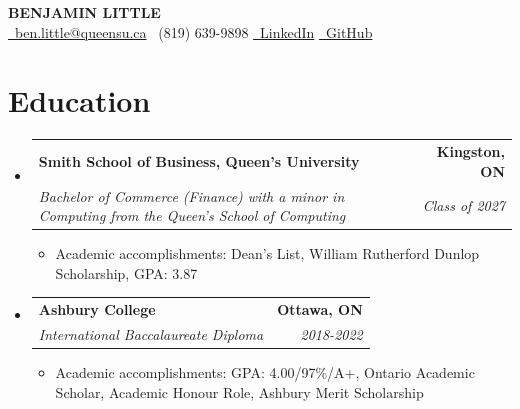 \documentclass[letterpaper,10pt]{article}
\makeatletter
\newcommand{\resumeItem}[1]{
  \item\small{
    {#1 \vspace{-2pt}}
  }
}
\newcommand{\resumeSubheading}[4]{
  \vspace{-2pt}\item
    \begin{tabular*}{1.0\textwidth}[t]{l@{\extracolsep{\fill}}r}
      \textbf{#1} & \textbf{\small #2} \\
      \textit{\small#3} & \textit{\small #4} \\
    \end{tabular*}\vspace{-7pt}
}
\newcommand{\resumeSubHeadingListStart}{\begin{itemize}[leftmargin=0.0in, label={}]}
\newcommand{\resumeSubHeadingListEnd}{\end{itemize}}
\newcommand{\resumeItemListStart}{\begin{itemize}[label=--]}
\newcommand{\resumeItemListEnd}{\end{itemize}\vspace{-5pt}}
\makeatother
\begin{document}
\begin{center}
    \textbf{\Huge \scshape BENJAMIN LITTLE} \\ \vspace{3pt}
    \scriptsize \href{mailto:ben.little@queensu.ca}{\faEnvelope \ ben.little@queensu.ca} \textbar{} \faPhone \ (819) 639-9898 \textbar{} \href{https://www.linkedin.com/in/benjamin-little1}{\faLinkedin \ LinkedIn} \textbar{} \href{https://github.com/BenLittle1}{\faGithub \ GitHub}
\end{center}
\vspace{-15pt}

\section{Education}
  \resumeSubHeadingListStart
    \resumeSubheading
      {Smith School of Business, Queen's University}{Kingston, ON}
      {Bachelor of Commerce (Finance) with a minor in Computing from the Queen's School of Computing}{Class of 2027}
      \resumeItemListStart
        \resumeItem{Academic accomplishments: Dean's List, William Rutherford Dunlop Scholarship, GPA: 3.87}
      \resumeItemListEnd
    \resumeSubheading
      {Ashbury College}{Ottawa, ON}
      {International Baccalaureate Diploma}{2018-2022}
      \resumeItemListStart
        \resumeItem{Academic accomplishments: GPA: 4.00/97\%/A+, Ontario Academic Scholar, Academic Honour Role, Ashbury Merit Scholarship}
      \resumeItemListEnd
  \resumeSubHeadingListEnd

\end{document}
